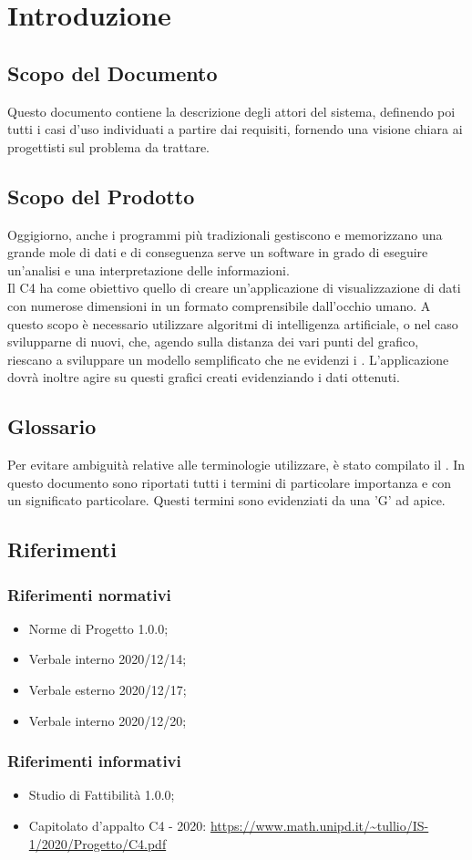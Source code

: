 \section{Introduzione}
\subsection{Scopo del Documento}
Questo documento contiene la descrizione degli attori del sistema, definendo poi tutti i casi d'uso individuati a partire dai requisiti, fornendo una visione chiara ai progettisti sul problema da trattare.
\subsection{Scopo del Prodotto}
Oggigiorno, anche i programmi più tradizionali gestiscono e memorizzano una grande mole di dati e di conseguenza serve un software in grado di eseguire un'analisi e una interpretazione delle informazioni.\\
Il  C4 ha come obiettivo quello di creare un'applicazione di visualizzazione di dati con numerose dimensioni in un formato comprensibile dall'occhio umano.  A questo scopo è necessario utilizzare algoritmi di intelligenza artificiale, o nel caso svilupparne di nuovi, che, agendo sulla distanza dei vari punti del grafico, riescano a sviluppare un modello semplificato che ne evidenzi i . 
L'applicazione dovrà inoltre agire su questi grafici creati evidenziando i dati ottenuti.
\subsection{Glossario}
Per evitare ambiguità relative alle terminologie utilizzare, è stato compilato il . In questo documento sono riportati tutti i termini di particolare importanza e con un significato particolare. Questi termini sono evidenziati da una 'G' ad apice.
\subsection{Riferimenti}
\subsubsection{Riferimenti normativi}
\begin{itemize}
	\item Norme di Progetto 1.0.0;
	\item Verbale interno 2020/12/14;
	\item Verbale esterno 2020/12/17;
	\item Verbale interno 2020/12/20;
\end{itemize}

\subsubsection{Riferimenti informativi}
\begin{itemize}
	\item Studio di Fattibilità 1.0.0;
	\item Capitolato d’appalto C4 - 2020:
	\url{https://www.math.unipd.it/~tullio/IS-1/2020/Progetto/C4.pdf}
\end{itemize}


